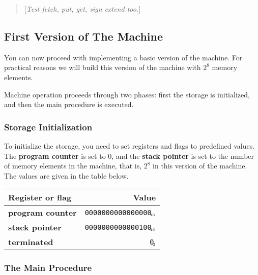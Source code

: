 \documentclass[a4paper,12pt]{article}
\newcommand{\num}[1]{\texttt{#1}\xspace}
\newcommand{\hex}[1]{\num{#1}$_{\textup{\tiny\hskip-1ex 16}}$\xspace}
\newcommand{\bin}[1]{\num{#1}$_{\textup{\tiny\hskip-1ex 2}}$\xspace}
\newcommand{\PC}{\textbf{program counter}\xspace}
\newcommand{\SP}{\textbf{stack pointer}\xspace}
\newcommand{\TERM}{\textbf{terminated}\xspace}
\newcommand{\F}{\bin{0}}
\newcommand{\comment}[1]{\begin{quote}[\textit{#1}]\end{quote}}
\begin{document}
\comment{Test fetch, put, get, sign extend too.}

\subsection{First Version of The Machine}

You can now proceed with implementing a basic version of the machine.
For practical reasons we will build this version of the machine with $2^{8}$ memory elements.

Machine operation proceeds through two phases: first the storage is initialized, and then the main procedure is executed.

\subsubsection{Storage Initialization}

To initialize the storage, you need to set registers and flags to predefined values.
The \PC is set to $0$, and the \SP is set to the number of memory elements in the machine, that is, $2^{8}$ in this version of the machine.
The values are given in the table below.

\begin{center}
  \begin{tabular}{@{}lr@{}}
    \hline
    Register or flag & Value                   \\
    \hline
    \PC              & \hex{0000000000000000}  \\
    \SP              & \hex{0000000000000100}  \\
    \TERM            & \F                      \\
    \hline
  \end{tabular}
\end{center}

\subsubsection{The Main Procedure}
\end{document}
